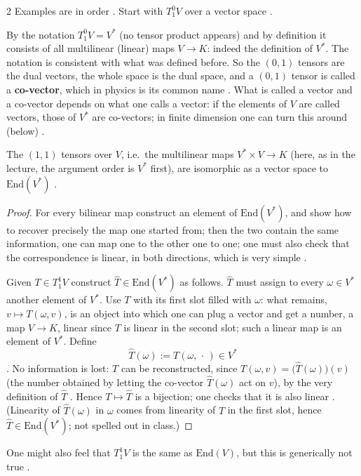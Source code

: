 \begin{paracol}{2}
Examples are in order . Start with $T^0_1V$ over a vector space .
\begin{example}\label{ex:te-01}
By the notation $T^0_1V=V^*$ (no tensor product appears) and by definition it consists of all multilinear (linear) maps $V\to K$: indeed the definition of $V^*$. The notation is consistent with what was defined before. So the $(0,1)$ tensors are the dual vectors, the whole space is the dual space,
and a $(0,1)$ tensor is called a \textbf{co-vector}, which in physics is its common name . What is called a vector and a co-vector depends on what one calls a vector: if the elements of $V$ are called vectors, those of $V^*$ are co-vectors; in finite dimension one can turn this around (below)
.
\end{example}

\begin{proposition}\label{prop:te-11}
The $(1,1)$ tensors over $V$, i.e.\ the multilinear maps $V^*\times V\to K$ (here, as in the lecture, the argument order is $V^*$ first), are isomorphic as a vector space to $\mathrm{End}(V^*)$
.
\end{proposition}
\begin{proof}
For every bilinear map construct an element of $\mathrm{End}(V^*)$, and show how to recover precisely the map one started from; then the two contain the same information, one can map one to the other one to one; one must also check that the correspondence is linear, in both directions, which is very simple
.

Given $T\in T^1_1V$ construct $\hat T\in\mathrm{End}(V^*)$ as follows. $\hat T$ must assign to every $\omega\in V^*$ another element of $V^*$. Use $T$ with its first slot filled with $\omega$: what remains, $v\mapsto T(\omega,v)$, is an object into which one can plug a vector and get a number,
a map $V\to K$, linear since $T$ is linear in the second slot; such a linear map is an element of $V^*$. Define
\[
  \hat T(\omega):=T(\omega,\,\cdot\,)\in V^*
\]
.
No information is lost: $T$ can be reconstructed, since $T(\omega,v)=\bigl(\hat T(\omega)\bigr)(v)$ (the number obtained by letting the co-vector $\hat T(\omega)$ act on $v$), by the very definition of $\hat T$ .
Hence $T\mapsto\hat T$ is a bijection; one checks that it is also linear . (Linearity of $\hat T(\omega)$ in $\omega$ comes from linearity of $T$ in the first slot, hence $\hat T\in\mathrm{End}(V^*)$; not spelled out in class.)
\end{proof}
One might also feel that $T^1_1V$ is the same as $\mathrm{End}(V)$, but this is generically not true .


\end{paracol}

